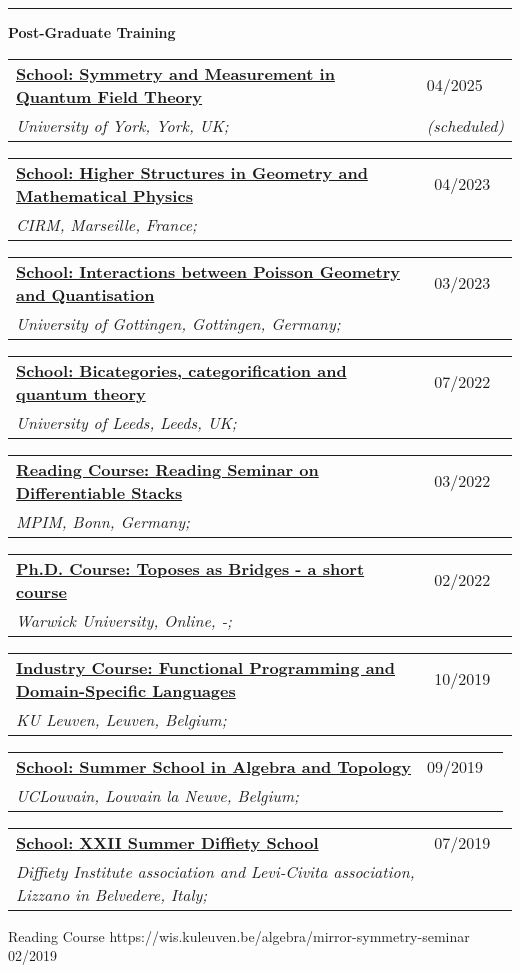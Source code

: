 \documentclass[a4paper]{article}
\newcommand{\block}[1]{\hrule \vspace{0.2cm} \textbf{\Large #1} \vspace{0.2cm}}
\newcommand{\longvoice}[8]{
    \begin{tabular}{p{0.83\linewidth} p{0.17\linewidth} }
        \textbf{\href{#3}{#2: #1}} & #4 
        \\ 
        \textit{#5, #6, #7;} & {\small\emph{#8}}
    \end{tabular}
    \vspace{.5em}
}
\begin{document}
    \block{Post-Graduate Training}

    
    \longvoice{Symmetry and Measurement in Quantum Field Theory}
        {School}
        {https://sites.google.com/york.ac.uk/symmetry-measurement-school/home?authuser=0}
        {04/2025}
        {University of York}
        {York}
        {UK}
        {(scheduled)}
    \longvoice{Higher Structures in Geometry and Mathematical Physics}
        {School}
        {https://conferences.cirm-math.fr/2697.html}
        {04/2023}
        {CIRM}
        {Marseille}
        {France}
        {}
    \longvoice{Interactions between Poisson Geometry and Quantisation}
        {School}
        {https://sites.google.com/view/poissonquantisation2023}
        {03/2023}
        {University of Gottingen}
        {Gottingen}
        {Germany}
        {}
    \longvoice{Bicategories, categorification and quantum theory}
        {School}
        {https://conferences.leeds.ac.uk/bcqt2022/}
        {07/2022}
        {University of Leeds}
        {Leeds}
        {UK}
        {}
    \longvoice{Reading Seminar on Differentiable Stacks}
        {Reading Course}
        {https://www.dropbox.com/s/a9tmw4g8m58ymkf/2203-Bonn-StackReadingSeminar.pdf?dl=0}
        {03/2022}
        {MPIM}
        {Bonn}
        {Germany}
        {}
    \longvoice{Toposes as Bridges - a short course}
        {Ph.D. Course}
        {https://warwick.ac.uk/fac/sci/maths/research/events/events2021-22/toposesasbridges/}
        {02/2022}
        {Warwick University}
        {Online}
        {-}
        {}
    \longvoice{Functional Programming and Domain-Specific Languages}
        {Industry Course}
        {https://dtai.cs.kuleuven.be/events/fpcourse/}
        {10/2019}
        {KU Leuven}
        {Leuven}
        {Belgium}
        {}
    \longvoice{Summer School in Algebra and Topology}
        {School}
        {https://web.archive.org/save/https://uclouvain.be/en/research-institutes/irmp/summer-school-in-algebra-and-topology-2019.html}
        {09/2019}
        {UCLouvain}
        {Louvain la Neuve}
        {Belgium}
        {}
    \longvoice{XXII Summer Diffiety School}
        {School}
        {https://sites.google.com/site/levicivitainstitute/Activities/DiffietySchools/xxii-summer-diffiety-school}
        {07/2019}
        {Diffiety Institute association and Levi-Civita association}
        {Lizzano in Belvedere}
        {Italy}
        {}
        {Reading Course}
        {https://wis.kuleuven.be/algebra/mirror-symmetry-seminar}
        {02/2019}
\end{document}
